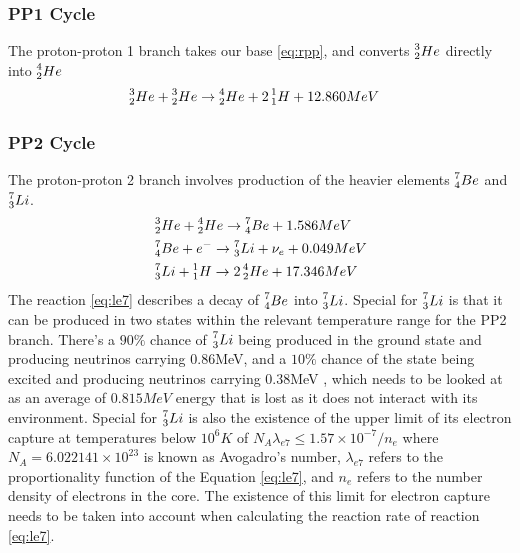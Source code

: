 \documentclass[10pt, nofootinbib, twocolumn]{revtex4-1}
\begin{document}
\subsubsection{PP1 Cycle}
The proton-proton 1 branch takes our base \eqref{eq:rpp}, and converts $\prescript{3}{2}He$ directly into $\prescript{4}{2}He$
\begin{align}
    & \prescript{3}{2}He+\prescript{3}{2}He\rightarrow\prescript{4}{2}He+2\prescript{1}{1}H + 12.860MeV \label{eq:r33}
\end{align}


\subsubsection{PP2 Cycle}
The proton-proton 2 branch involves production of the heavier elements $\prescript{7}{4}Be$ and $\prescript{7}{3}Li$. 
\begin{align}
    & \prescript{3}{2}He+\prescript{4}{2}He\rightarrow\prescript{7}{4}Be+1.586MeV \label{eq:r34}\\
    & \prescript{7}{4}Be+e^-\rightarrow \prescript{7}{3}Li+\nu_e+0.049MeV \label{eq:le7}\\
    & \prescript{7}{3}Li+\prescript{1}{1}H \rightarrow 2\prescript{4}{2}He+17.346MeV \label{eq:l17l}
\end{align}
The reaction \eqref{eq:le7} describes a decay of $\prescript{7}{4}Be$ into $\prescript{7}{3}Li$. Special for $\prescript{7}{3}Li$ is that it can be produced in two states within the relevant temperature range for the PP2 branch. There's a $90\%$ chance of $\prescript{7}{3}Li$ being produced in the ground state and producing neutrinos carrying 0.86MeV, and a $10\%$ chance of the state being excited and producing neutrinos carrying 0.38MeV \cite{ast}, which needs to be looked at as an average of $0.815MeV$ energy that is lost as it does not interact with its environment. Special for $\prescript{7}{3}Li$ is also the existence of the upper limit of its electron capture at temperatures below $10^6 K$ of $N_A \lambda_{e7} \leq 1.57 \times 10^{-7}/n_e$ where $N_A=6.022141\times10^{23}$ is known as Avogadro's number, $\lambda_{e7}$ refers to the proportionality function of the Equation \eqref{eq:le7}, and $n_e$ refers to the number density of electrons in the core. The existence of this limit  for electron capture needs to be taken into account when calculating the reaction rate of reaction \eqref{eq:le7}.
\end{document}
